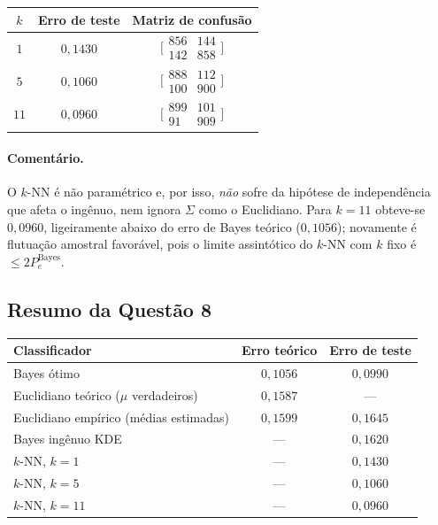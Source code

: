 ﻿\documentclass[12pt,a4paper]{article}
\begin{document}
\begin{center}
\begin{tabular}{ccc}
\toprule
$k$ & Erro de teste & Matriz de confus\~ao\\
\midrule
$1$ & $0{,}1430$ & $\bigl[\begin{smallmatrix}856 & 144\\ 142 & 858\end{smallmatrix}\bigr]$\\[2pt]
$5$ & $0{,}1060$ & $\bigl[\begin{smallmatrix}888 & 112\\ 100 & 900\end{smallmatrix}\bigr]$\\[2pt]
$11$ & $0{,}0960$ & $\bigl[\begin{smallmatrix}899 & 101\\ 91 & 909\end{smallmatrix}\bigr]$\\
\bottomrule
\end{tabular}
\end{center}

\paragraph{Coment\'ario.} O $k$-NN \'e n\~ao param\'etrico e, por isso,
\emph{n\~ao} sofre da hip\'otese de independ\^encia que afeta o
ing\^enuo, nem ignora $\Sigma$ como o Euclidiano. Para $k=11$ obteve-se
$0{,}0960$, ligeiramente abaixo do erro de Bayes te\'orico
($0{,}1056$); novamente \'e flutua\c{c}\~ao amostral favor\'avel, pois
o limite assint\'otico do $k$-NN com $k$ fixo \'e
$\le 2P_e^{\mathrm{Bayes}}$.

\clearpage
\subsection*{Resumo da Quest\~ao 8}

\begin{center}
\begin{tabular}{lcc}
\toprule
Classificador & Erro te\'orico & Erro de teste\\
\midrule
Bayes \'otimo & $0{,}1056$ & $0{,}0990$\\
Euclidiano te\'orico ($\mu$ verdadeiros) & $0{,}1587$ & ---\\
Euclidiano emp\'irico (m\'edias estimadas) & $0{,}1599$ & $0{,}1645$\\
Bayes ing\^enuo KDE & --- & $0{,}1620$\\
$k$-NN, $k=1$ & --- & $0{,}1430$\\
$k$-NN, $k=5$ & --- & $0{,}1060$\\
$k$-NN, $k=11$ & --- & $0{,}0960$\\
\bottomrule
\end{tabular}\\[2pt]
\end{center}
\end{document}
